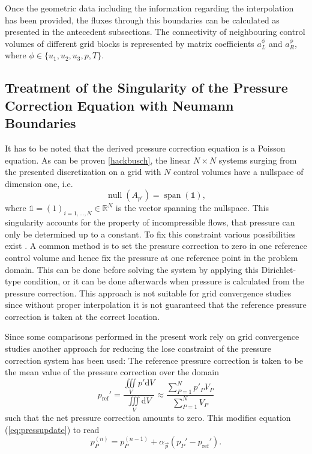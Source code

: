 Once the geometric data including the information regarding the interpolation has been provided, the fluxes through this boundaries can be calculated as presented in the antecedent subsections. The connectivity of neighbouring control volumes of different grid blocks is represented by matrix coefficients \(a_L^{\phi}\) and \(a_R^{\phi}\), where \(\phi \in \{u_1,u_2,u_3,p,T\}\).

\subsection{Treatment of the Singularity of the Pressure Correction Equation with Neumann Boundaries}
\label{sec:singularitytreatment}

It has to be noted that the derived pressure correction equation is a Poisson equation. As can be proven \ref{hackbusch}, the linear \(N \times N\) systems surging from the presented discretization on a grid with \(N\) control volumes have a nullspace of dimension one, i.e.
\begin{displaymath}
  \operatorname{null}(A_{p'}) = \operatorname{span}(\mathbb{1}),
\end{displaymath}
where \(\mathbb{1} = (1)_{i = 1,\dots,N} \in \mathbb{R}^N\) is the vector spanning the nullspace. This singularity accounts for the property of incompressible flows, that pressure can only be determined up to a constant. To fix this constraint various possibilities exist \cite{ferziger02}. A common method is to set the pressure correction to zero in one reference control volume and hence fix the pressure at one reference point in the problem domain. This can be done before solving the system by applying this Dirichlet-type condition, or it can be done afterwards when pressure is calculated from the pressure correction. This approach is not suitable for grid convergence studies since without proper interpolation it is not guaranteed that the reference pressure correction is taken at the correct location.

Since some comparisons performed in the present work rely on grid convergence studies another approach for reducing the lose constraint of the pressure correction system has been used: The reference pressure correction is taken to be the mean value of the pressure correction over the domain 
\begin{displaymath}
  p_{\text{ref}}' 
  = \frac{\iiint\limits_V p' \mathrm{d}V}{\iiint\limits_V \mathrm{d}V} 
    \approx \frac{\sum_{P = 1}^N p'_P V_P}{\sum_{P = 1}^N V_P}
\end{displaymath}
such that the net pressure correction amounts to zero. This modifies equation (\ref{eq:pressupdate}) to read
\begin{equation}
  \label{eq:pressupdate2}
  p_P^{(n)} = p_P^{(n-1)} + \alpha_{\vec{p}} \left( p_P' - p_{\text{ref}}' \right).
\end{equation}

